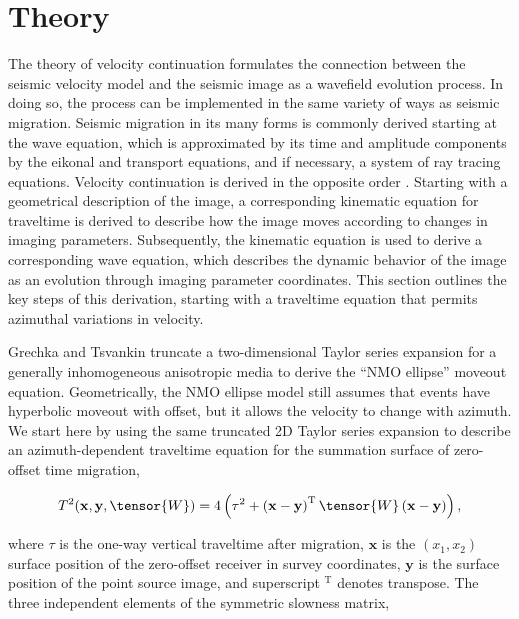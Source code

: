 \section{Theory}
The theory of velocity continuation formulates the connection between the seismic velocity model and the seismic image as a wavefield evolution process. 
In doing so, the process can be implemented in the same variety of ways as seismic migration. 
Seismic migration in its many forms is commonly derived starting at the wave equation, which is approximated by its time and amplitude components by the eikonal and transport equations, and if necessary, a system of ray tracing equations. 
Velocity continuation is derived in the opposite order \cite[]{GEO68-05-16501661}. 
Starting with a geometrical description of the image, a corresponding kinematic equation for traveltime is derived to describe how the image moves according to changes in imaging parameters. 
Subsequently, the kinematic equation is used to derive a corresponding wave equation, which describes the dynamic behavior of the image as an evolution through imaging parameter coordinates. 
This section outlines the key steps of this derivation, starting with a traveltime equation that permits azimuthal variations in velocity. 

Grechka and Tsvankin \cite{GEO63-03-10791092} truncate a two-dimensional Taylor series expansion for a generally inhomogeneous anisotropic media to derive the ``NMO ellipse'' moveout equation. 
Geometrically, the NMO ellipse model still assumes that events have hyperbolic moveout with offset, but it allows the velocity to change with azimuth. 
We start here by using the same truncated 2D Taylor series expansion to describe an azimuth-dependent traveltime equation for the summation surface of zero-offset time migration,

\begin{equation}
\label{eq:TofW}
T^2(\mathbf{x},\mathbf{y},\tensor{W})=4\left(\tau ^2+\left( \mathbf{x}-\mathbf{y}\right) ^{\mathrm{T}}\tensor{W}\left( \mathbf{x}-\mathbf{y}\right) \right),
\end{equation}

\noindent where $\tau $ is the one-way vertical traveltime after migration, $\mathbf{x}$ is the $(x_1,x_2)$ surface position of the zero-offset receiver in survey coordinates, $\mathbf{y}$ is the surface position of the point source image, and superscript ${}^{\mathrm{T}}$ denotes transpose.  
The three independent elements of the symmetric slowness matrix,

